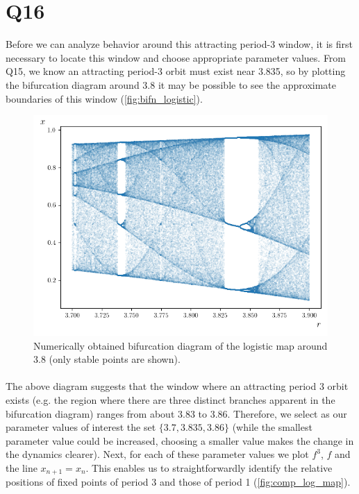 \documentclass{article}
\begin{document}
\section*{Q16}
Before we can analyze behavior around this attracting period-3 window, it is first necessary to 
locate this window and choose appropriate parameter values. From Q15, we know an attracting period-3 
orbit must exist near 3.835, so by plotting the bifurcation diagram around 3.8 it may be possible 
to see the approximate boundaries of this window (\autoref{fig:bifn_logistic}).

\begin{figure}[H]
    \centering
    \includegraphics[scale = 0.7]{Figure_4.png}
	\caption{Numerically obtained bifurcation diagram of the logistic map around 3.8 (only stable 
    points are shown).}
    \label{fig:bifn_logistic}
\end{figure}

\paragraph{}
The above diagram suggests that the window where an attracting period 3 orbit exists (e.g. the 
region where there are three distinct branches apparent in the bifurcation diagram) ranges from 
about 3.83 to 3.86. Therefore, we select as our parameter values of interest the set $\{3.7, 3.835, 3.86\}$ 
(while the smallest parameter value could be increased, choosing a smaller value makes the change 
in the dynamics clearer). 
Next, for each of these parameter values we plot $f^3$, $f$ and the line $x_{n+1} = x_n$. This enables us 
to straightforwardly identify the relative positions of fixed points of period 3 and those of 
period 1 (\autoref{fig:comp_log_map}).
\end{document}
